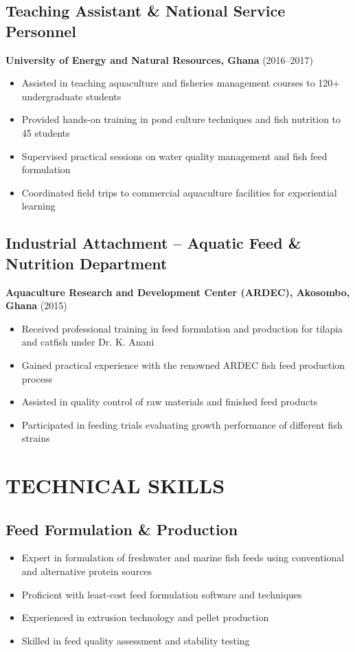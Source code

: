 \documentclass[11pt,a4paper]{article}
\begin{document}
\subsection{Teaching Assistant \& National Service Personnel}
\textbf{University of Energy and Natural Resources, Ghana} \hfill (2016–2017)
\begin{itemize}[leftmargin=*,noitemsep]
    \item Assisted in teaching aquaculture and fisheries management courses to 120+ undergraduate students
    \item Provided hands-on training in pond culture techniques and fish nutrition to 45 students
    \item Supervised practical sessions on water quality management and fish feed formulation
    \item Coordinated field trips to commercial aquaculture facilities for experiential learning
\end{itemize}

\subsection{Industrial Attachment – Aquatic Feed \& Nutrition Department}
\textbf{Aquaculture Research and Development Center (ARDEC), Akosombo, Ghana} \hfill (2015)
\begin{itemize}[leftmargin=*,noitemsep]
    \item Received professional training in feed formulation and production for tilapia and catfish under Dr. K. Anani
    \item Gained practical experience with the renowned ARDEC fish feed production process
    \item Assisted in quality control of raw materials and finished feed products
    \item Participated in feeding trials evaluating growth performance of different fish strains
\end{itemize}

\section{TECHNICAL SKILLS}

\subsection{Feed Formulation \& Production}
\begin{itemize}[leftmargin=*,noitemsep]
    \item Expert in formulation of freshwater and marine fish feeds using conventional and alternative protein sources
    \item Proficient with least-cost feed formulation software and techniques
    \item Experienced in extrusion technology and pellet production
    \item Skilled in feed quality assessment and stability testing
\end{itemize}
\end{document}
